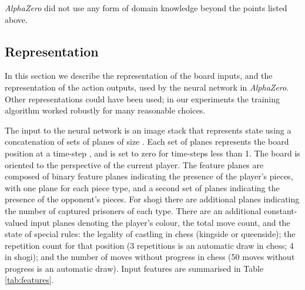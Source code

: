 \documentclass[12pt]{article}
\begin{document}
\emph{AlphaZero} did not use any form of domain knowledge beyond the points listed above. 

\subsection*{Representation}

In this section we describe the representation of the board inputs, and the representation of the action outputs, used by the neural network in \emph{AlphaZero}. Other representations could have been used; in our experiments the training algorithm worked robustly for many reasonable choices.

The input to the neural network is an  image stack that represents state using a concatenation of  sets of  planes of size . Each set of planes represents the board position at a time-step , and is set to zero for time-steps less than 1. The board is oriented to the perspective of the current player. The  feature planes are composed of binary feature planes indicating the presence of the player's pieces, with one plane for each piece type, and a second set of planes indicating the presence of the opponent's pieces. For shogi there are additional planes indicating the number of captured prisoners of each type. There are an additional   constant-valued input planes denoting the player's colour, the total move count, and the state of special rules: the legality of castling in chess (kingside or queenside); the repetition count for that position (3 repetitions is an automatic draw in chess; 4 in shogi); and the number of moves without progress in chess (50 moves without progress is an automatic draw). Input features are summarised in Table \ref{tab:features}.
\end{document}
